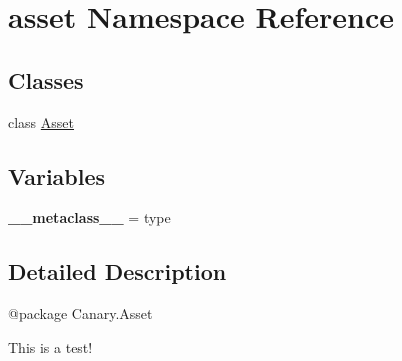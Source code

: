 \hypertarget{namespaceasset}{\section{asset Namespace Reference}
\label{namespaceasset}
}
\subsection*{Classes}
\begin{DoxyCompactItemize}
\item 
class \hyperlink{classasset_1_1_asset}{Asset}
\end{DoxyCompactItemize}
\subsection*{Variables}
\begin{DoxyCompactItemize}
\item 
\hypertarget{namespaceasset_a2ae80da3053a8479180d469002bf93cf}{{\bfseries \-\_\-\-\_\-metaclass\-\_\-\-\_\-} = type}\label{namespaceasset_a2ae80da3053a8479180d469002bf93cf}

\end{DoxyCompactItemize}


\subsection{Detailed Description}
\begin{DoxyVerb}@package Canary.Asset

This is a test!
\end{DoxyVerb}
 